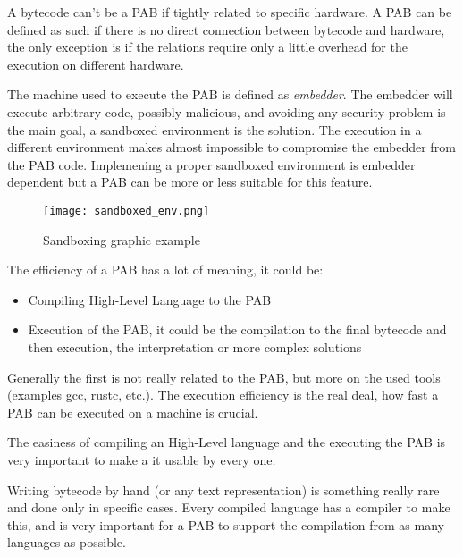 \documentclass[../main.tex]{subfiles}
\begin{document}
\begin{description}[style=nextline]
  \item[Hardware Independence]
        A bytecode can't be a PAB if tightly related to specific hardware. A PAB can be defined as such if there is no direct connection between bytecode and hardware, the only exception is if the relations require only a little overhead for the execution on different hardware.
  \item[Sandboxing]
        The machine used to execute the PAB is defined as \textit{embedder}. The embedder will execute arbitrary code, possibly malicious, and avoiding any security problem is the main goal, a sandboxed environment is the solution. The execution in a different environment makes almost impossible to compromise the embedder from the PAB code. Implemening a proper sandboxed environment is embedder dependent but a PAB can be more or less suitable for this feature.

        \begin{figure}[h]
          \centering
          \texttt{[image: sandboxed\_env.png]}
          \caption{Sandboxing graphic example}
          \label{fig:Sandboxing graphic example}
        \end{figure}

  \item[Efficiency]
        The efficiency of a PAB has a lot of meaning, it could be:

        \begin{itemize}
          \item Compiling High-Level Language to the PAB
          \item Execution of the PAB, it could be the compilation to the final bytecode and then execution, the interpretation or more complex solutions
        \end{itemize}

        Generally the first is not really related to the PAB, but more on the used tools (examples gcc, rustc, etc.). The execution efficiency is the real deal, how fast a PAB can be executed on a machine is crucial.
  \item[Tool Simplicity]
        The easiness of compiling an High-Level language and the executing the PAB is very important to make a it usable by every one.
  \item[Support as Compilation Target]
        Writing bytecode by hand (or any text representation) is something really rare and done only in specific cases. Every compiled language has a compiler to make this, and is very important for a PAB to support the compilation from as many languages as possible.
\end{description}
\end{document}
